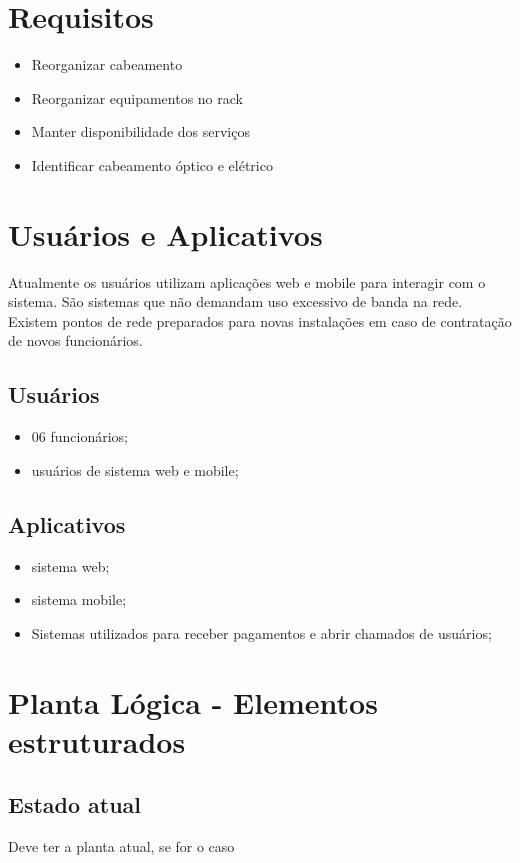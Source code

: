 \documentclass[	DIV=calc,%
paper=a4,%
fontsize=12pt,%
onecolumn]{scrartcl}	 					%
\begin{document}
	\section{Requisitos}
	\begin{itemize}
		\item Reorganizar cabeamento
		\item Reorganizar equipamentos no rack
		\item Manter disponibilidade dos serviços
		\item Identificar cabeamento óptico e elétrico
	\end{itemize}
	
	\section{Usuários e Aplicativos}
	Atualmente os usuários utilizam aplicações web e mobile para interagir com o sistema. São sistemas que não demandam uso excessivo de banda na rede. Existem pontos de rede preparados para novas instalações em caso de contratação de novos funcionários.
	
	
	\subsection{Usuários}
	\begin{itemize}
		\item 06 funcionários;
		\item usuários de sistema web e mobile;
	\end{itemize}
	
	\subsection{Aplicativos}
	\begin{itemize}
		\item sistema web;
		\item sistema mobile;
		\item Sistemas utilizados para receber pagamentos e abrir chamados de usuários;
	\end{itemize}
	

	\section{Planta Lógica - Elementos estruturados}
	
	\subsection{Estado atual}
	Deve ter a planta atual, se for o caso
	
\end{document}
